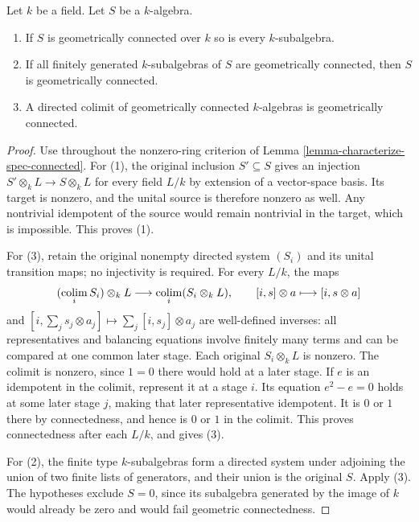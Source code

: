 \begin{lemma}
\label{lemma-subalgebra-geometrically-connected}
Let $k$ be a field. Let $S$ be a $k$-algebra.
\begin{enumerate}
\item If $S$ is geometrically connected over $k$ so is every
$k$-subalgebra.
\item If all finitely generated $k$-subalgebras of $S$ are
geometrically connected, then $S$ is geometrically connected.
\item A directed colimit of geometrically connected $k$-algebras
is geometrically connected.
\end{enumerate}
\end{lemma}

\begin{proof}
Use throughout the nonzero-ring
criterion of Lemma
\ref{lemma-characterize-spec-connected}.
For (1), the original inclusion
$S'\subseteq S$ gives an injection
$S'\otimes_k L\to S\otimes_k L$
for every field $L/k$ by extension
of a vector-space basis. Its
target is nonzero, and the
unital source is therefore
nonzero as well. Any nontrivial
idempotent of the source would
remain nontrivial in the target,
which is impossible. This proves (1).

For (3), retain the original
nonempty directed system $(S_i)$
and its unital transition maps;
no injectivity is required.
For every $L/k$, the maps
$$
(\mathop{\rm colim}_i S_i)\otimes_k L
\longrightarrow\mathop{\rm colim}_i(S_i\otimes_k L),
\qquad[i,s]\otimes a\longmapsto[i,s\otimes a]
$$
and $[i,\sum_j s_j\otimes a_j]\mapsto\sum_j[i,s_j]\otimes a_j$
are well-defined inverses:
all representatives and balancing
equations involve finitely many
terms and can be compared at
one common later stage.
Each original $S_i\otimes_k L$
is nonzero. The colimit is
nonzero, since $1=0$ there
would hold at a later stage.
If $e$ is an idempotent in
the colimit, represent it at
a stage $i$. Its equation
$e^2-e=0$ holds at some later
stage $j$, making that later
representative idempotent.
It is $0$ or $1$ there by
connectedness, and hence is
$0$ or $1$ in the colimit.
This proves connectedness after
each $L/k$, and gives (3).

For (2), the finite type
$k$-subalgebras form a directed
system under adjoining the union
of two finite lists of generators,
and their union is the original
$S$. Apply (3). The hypotheses
exclude $S=0$, since its
subalgebra generated by the
image of $k$ would already
be zero and would fail
geometric connectedness.


\end{proof}
